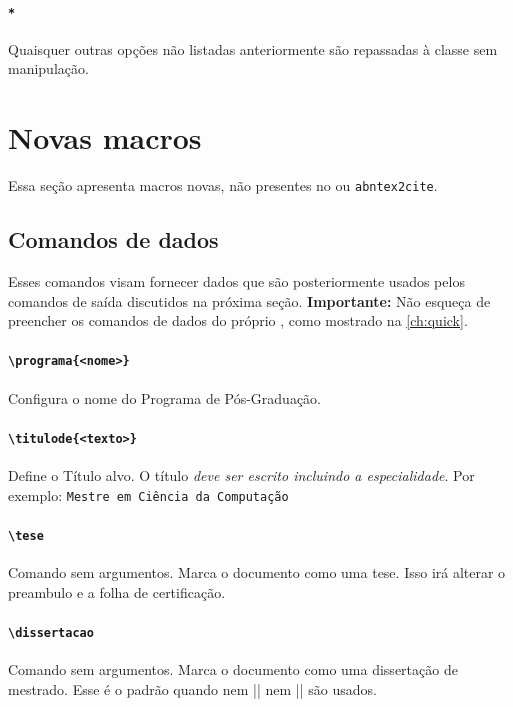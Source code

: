 \documentclass[embeddedlogo]{ufsc-thesis-rn46-2019}
\begin{document}
\paragraph*{\texttt{*}}  Quaisquer outras opções não listadas anteriormente são repassadas à classe \abnTeX sem manipulação.

\section{Novas macros}

Essa seção apresenta macros novas, não presentes no \abnTeX ou \texttt{abntex2cite}.

\subsection{Comandos de dados}

Esses comandos visam fornecer dados que são posteriormente usados pelos comandos de saída discutidos na próxima seção. \textbf{Importante:} Não esqueça de preencher os comandos de dados do próprio \abnTeX, como mostrado na \autoref{ch:quick}.

\paragraph*{\texttt{\textbackslash{}programa\{<nome>\}}} Configura o nome do Programa de Pós-Graduação. 

\paragraph*{\texttt{\textbackslash{}titulode\{<texto>\}}} Define o Título alvo. O título \textit{deve ser escrito incluindo a especialidade}. Por exemplo: \texttt{Mestre em Ciência da Computação}

\paragraph*{\texttt{\textbackslash{}tese}} Comando sem argumentos. Marca o documento como uma tese. Isso irá alterar o preambulo e a folha de certificação.

\paragraph*{\texttt{\textbackslash{}dissertacao}} Comando sem argumentos. Marca o documento como uma dissertação de mestrado. Esse é o padrão quando nem \mt|\dissertacao| nem \mt|\tese| são usados.
\end{document}

